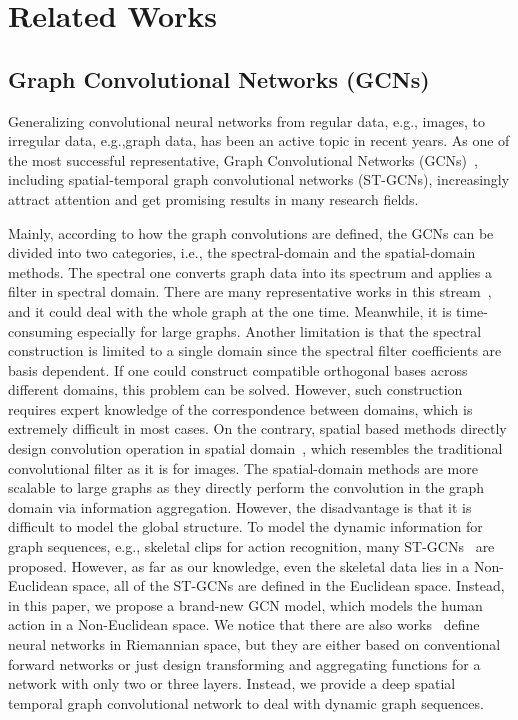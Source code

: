 \documentclass[letterpaper]{article} \usepackage{aaai19}  \usepackage{times}  \usepackage{helvet} \usepackage{courier}  \usepackage[hyphens]{url}  \usepackage{graphicx} \urlstyle{rm} \def\UrlFont{\rm}  \usepackage{graphicx}  \frenchspacing  \setlength{\pdfpagewidth}{8.5in}  \setlength{\pdfpageheight}{11in}
\begin{document}
\section{Related Works}\label{sec:relate}

\subsection{Graph Convolutional Networks (GCNs)}

Generalizing convolutional neural networks from regular data, e.g., images, to irregular data, e.g.,graph data, has been an active topic in recent years. As one of the most successful representative, Graph Convolutional Networks (GCNs)~\cite{monti2017geometric,velivckovic2018graph,kipf2016semi,defferrard2016convolutional}, including spatial-temporal graph convolutional networks (ST-GCNs), increasingly attract attention and get promising results in many research fields. 

Mainly, according to how the graph convolutions are defined, the GCNs can be divided into two categories, i.e., the spectral-domain and the spatial-domain methods. The spectral one converts graph data into its spectrum and applies a filter in spectral domain. There are many representative works in this stream~\cite{kipf2016semi,defferrard2016convolutional}, and it could deal with the whole graph at the one time. Meanwhile, it is time-consuming especially for large graphs. Another limitation is that the spectral construction is limited to a single domain since the spectral filter coefficients are basis dependent. If one could construct compatible orthogonal bases across different domains, this problem can be solved. However, such construction requires expert knowledge of the correspondence between domains, which is extremely difficult in most cases. On the contrary, spatial based methods directly design convolution operation in spatial domain~\cite{monti2017geometric,velivckovic2018graph}, which resembles the traditional convolutional filter as it is for images. The spatial-domain methods are more scalable to large graphs as they directly perform the convolution in the graph domain via information aggregation. However, the disadvantage is that it is difficult to model the global structure.  To model the dynamic information for graph sequences, e.g., skeletal clips for action recognition, many ST-GCNs~\cite{yan2018stgan,shi2019two,peng2020learning} are proposed. However, as far as our knowledge, even the skeletal data lies in a Non-Euclidean space, all of the ST-GCNs are defined in the Euclidean space. Instead, in this paper, we propose a brand-new GCN model, which models the human action  in a Non-Euclidean space. We notice that there are also works~\cite{nickel2017poincare,ganea2018hyperbolic,liu2019hyperbolic} define neural networks in Riemannian space, but they are either based on conventional forward networks or just design transforming and aggregating functions for a network with only two or three layers. Instead, we provide a deep spatial temporal graph convolutional network to deal with dynamic graph sequences.
\vspace{-1em}
\end{document}
